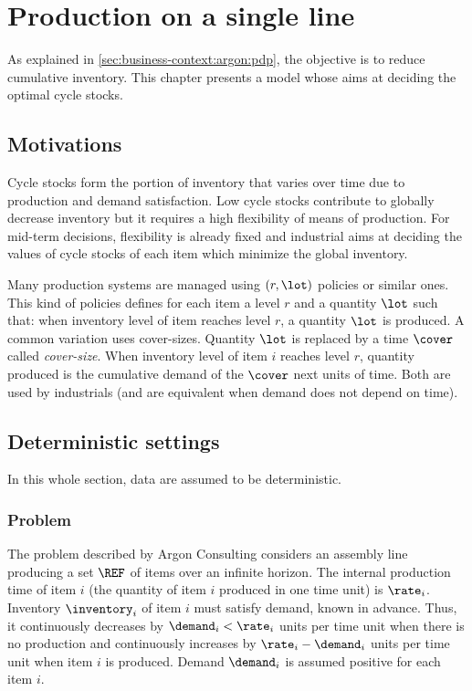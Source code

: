 \chapter{Production on a single line}
\label{chap:lot-size:single-line}


As explained in \cref{sec:business-context:argon:pdp}, the objective is to reduce cumulative inventory.
This chapter presents a model whose aims at deciding the optimal cycle stocks.



\section{Motivations}
\label{sec:lot-size:single-line:motivations}

Cycle stocks form the portion of inventory that varies over time due to production and demand satisfaction.
Low cycle stocks contribute to globally decrease inventory but it requires a high flexibility of means of production.
For mid-term decisions, flexibility is already fixed and industrial aims at deciding the values of cycle stocks of each item which minimize the global inventory.


Many production systems are managed using $(r,\lot)$ policies or similar ones.
This kind of policies defines for each item a level $r$ and a quantity $\lot$ such that: when inventory level of item reaches level $r$, a quantity $\lot$ is produced.
A common variation uses cover-sizes.
Quantity $\lot$ is replaced by a time $\cover$ called \emph{cover-size}.
When inventory level of item $i$ reaches level $r$, quantity produced is the cumulative demand of the $\cover$ next units of time.
Both are used by industrials (and are equivalent when demand does not depend on time).


\section{Deterministic settings}
\label{sec:lot-size:single-line:deterministic}

In this whole section, data are assumed to be deterministic.


\subsection{Problem}
\label{sec:lot-size:single-line:deterministic:problems}

The problem described by Argon Consulting considers an assembly line producing a set $\REF$ of items over an infinite horizon.
The internal production time of item $i$ (\ie the quantity of item $i$ produced in one time unit) is $\rate_i$.
Inventory $\inventory_i$ of item $i$ must satisfy demand, known in advance.
Thus, it continuously decreases by $\demand_i<\rate_i$ units per time unit when there is no production and continuously increases by $\rate_i-\demand_i$ units per time unit when item $i$ is produced.
Demand $\demand_i$ is assumed positive for each item $i$.


